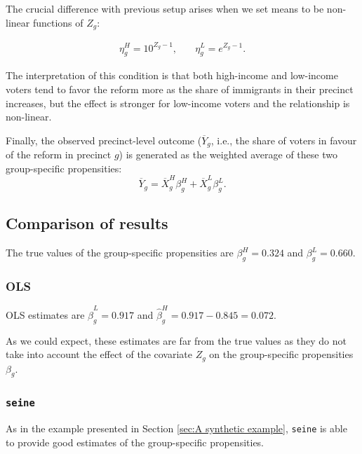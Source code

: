 The crucial difference with previous setup arises when we set means to be non-linear functions of $Z_g$:

\begin{align*}
\eta_{g}^{H} = 10^{Z_g-1}, \quad & \eta_{g}^{L} = e^{Z_g-1}.
\end{align*}

The interpretation of this condition is that both high-income and low-income voters tend to favor the reform more as the share of immigrants in their precinct increases, but the effect is stronger for low-income voters and the relationship is non-linear.

Finally, the observed precinct-level outcome ($\overline{Y}_{g}$, i.e., the share of voters in favour of the reform in precinct $g$) is generated as the weighted average of these two group-specific propensities:
\[
\overline{Y}_{g}=\overline{X}_{g}^{H}\beta_{g}^{H}+\overline{X}_{g}^{L}\beta_{g}^{L}.
\]

\subsection{Comparison of results}

The true values of the group-specific propensities are $\beta_{g}^{H} = 0.324$ and $\beta_{g}^{L} = 0.660$.



\subsubsection{OLS}



OLS estimates are $\hat{\beta}_{g}^{L} = 0.917$ and $\hat{\beta}_{g}^{H} = 0.917-0.845 = 0.072$.

As we could expect, these estimates are far from the true values as they do not take into account the effect of the covariate $Z_g$ on the group-specific propensities $\beta_g$.

\subsubsection{\texttt{seine}}



As in the example presented in Section \ref{sec:A synthetic example}, \texttt{seine} is able to provide good estimates of the group-specific propensities.

